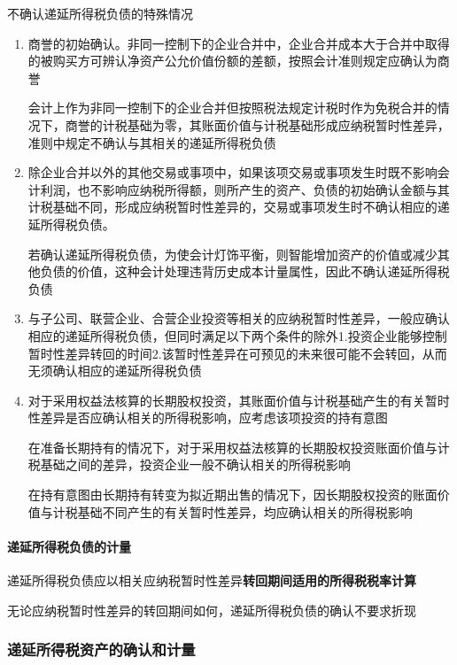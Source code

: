 \documentclass[UTF8,12pt]{ctexart}
\numberwithin{equation}{section} %
\numberwithin{figure}{section}
\numberwithin{table}{section}
\begin{document}
	不确认递延所得税负债的特殊情况
	\begin{enumerate}
		\item 商誉的初始确认。非同一控制下的企业合并中，企业合并成本大于合并中取得的被购买方可辨认净资产公允价值份额的差额，按照会计准则规定应确认为商誉
		
		会计上作为非同一控制下的企业合并但按照税法规定计税时作为免税合并的情况下，商誉的计税基础为零，其账面价值与计税基础形成应纳税暂时性差异，准则中规定不确认与其相关的递延所得税负债
		
		\item 除企业合并以外的其他交易或事项中，如果该项交易或事项发生时既不影响会计利润，也不影响应纳税所得额，则所产生的资产、负债的初始确认金额与其计税基础不同，形成应纳税暂时性差异的，交易或事项发生时不确认相应的递延所得税负债。
		
		若确认递延所得税负债，为使会计灯饰平衡，则智能增加资产的价值或减少其他负债的价值，这种会计处理违背历史成本计量属性，因此不确认递延所得税负债
		
		\item 与子公司、联营企业、合营企业投资等相关的应纳税暂时性差异，一般应确认相应的递延所得税负债，但同时满足以下两个条件的除外1.投资企业能够控制暂时性差异转回的时间2.该暂时性差异在可预见的未来很可能不会转回，从而无须确认相应的递延所得税负债
		
		\item 对于采用权益法核算的长期股权投资，其账面价值与计税基础产生的有关暂时性差异是否应确认相关的所得税影响，应考虑该项投资的持有意图
		
		在准备长期持有的情况下，对于采用权益法核算的长期股权投资账面价值与计税基础之间的差异，投资企业一般不确认相关的所得税影响
		
		在持有意图由长期持有转变为拟近期出售的情况下，因长期股权投资的账面价值与计税基础不同产生的有关暂时性差异，均应确认相关的所得税影响
	\end{enumerate}


	
	\paragraph{递延所得税负债的计量}
	递延所得税负债应以相关应纳税暂时性差异\textbf{转回期间适用的所得税税率计算}
	
	无论应纳税暂时性差异的转回期间如何，递延所得税负债的确认不要求折现
	
	\subsubsection{递延所得税资产的确认和计量}
\end{document}
